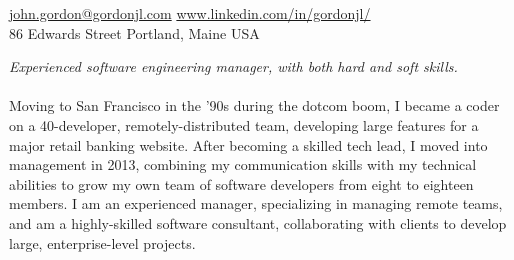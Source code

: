 \documentclass[10pt,a4paper]{article}
\begin{document}
\sloppy  %



\nobreakvspace{0.3em}  %

\noindent\href{mailto:john.gordon@gordonjl.com}{john.gordon\mbox{}@\mbox{}gordonjl.com}\sbull
{}\sbull
\href{https://www.linkedin.com/in/gordonjl/}{www.linkedin.com/in/gordonjl/}
\\
86 Edwards Street\sbull
Portland, Maine\sbull
USA

\spacedhrule{0.9em}{-0.4em}  %


\vspace{-1.3em}  %
\begin{multicols}{2}  %
\noindent \emph{Experienced software engineering manager, with both hard 
and soft skills.}
\\
\\
Moving to San Francisco in the '90s during the dotcom boom, I became a coder on a 40-developer, remotely-distributed team, developing large features for a major retail banking website. After becoming a skilled tech lead, I moved into management in 2013, combining my communication skills with my technical abilities to grow my own team of software developers from eight to eighteen members. I am an experienced manager, specializing in managing remote teams, and am a highly-skilled software consultant, collaborating with clients to develop large, enterprise-level projects.
\end{multicols}


\spacedhrule{0em}{-0.4em}

\end{document}
